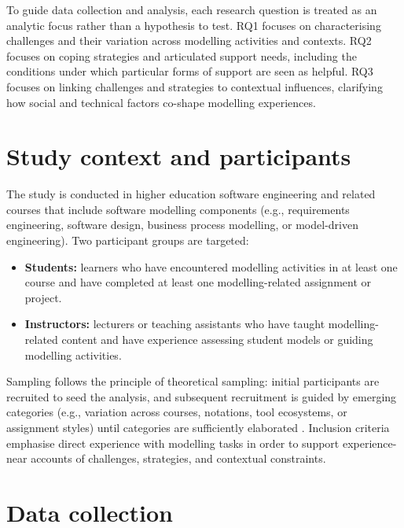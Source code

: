 To guide data collection and analysis, each research question is treated as an analytic focus rather than a hypothesis to test. RQ1 focuses on characterising challenges and their variation across modelling activities and contexts. RQ2 focuses on coping strategies and articulated support needs, including the conditions under which particular forms of support are seen as helpful. RQ3 focuses on linking challenges and strategies to contextual influences, clarifying how social and technical factors co-shape modelling experiences.

\section{Study context and participants}
\label{sec:method_context_participants}

The study is conducted in higher education software engineering and related courses that include software modelling components (e.g., requirements engineering, software design, business process modelling, or model-driven engineering). Two participant groups are targeted:
\begin{itemize}
    \item \textbf{Students:} learners who have encountered modelling activities in at least one course and have completed at least one modelling-related assignment or project.
    \item \textbf{Instructors:} lecturers or teaching assistants who have taught modelling-related content and have experience assessing student models or guiding modelling activities.
\end{itemize}

Sampling follows the principle of theoretical sampling: initial participants are recruited to seed the analysis, and subsequent recruitment is guided by emerging categories (e.g., variation across courses, notations, tool ecosystems, or assignment styles) until categories are sufficiently elaborated \cite{adolph2011using,stol2016grounded}. Inclusion criteria emphasise direct experience with modelling tasks in order to support experience-near accounts of challenges, strategies, and contextual constraints.

\section{Data collection}
\label{sec:method_data_collection}

